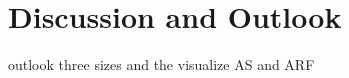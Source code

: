 \chapter[Discussion \& Outlook]{Discussion and Outlook}\label{ch:discussion}

outlook three sizes and the visualize AS and ARF

